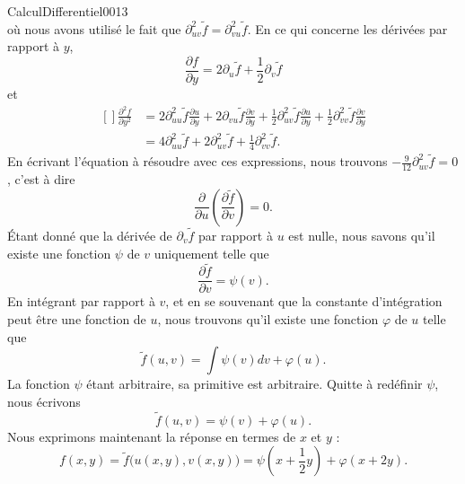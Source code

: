 \begin{corrige}{CalculDifferentiel0013}
\begin{equation}
	\end{equation}
	où nous avons utilisé le fait que $\partial^2_{uv}\tilde f=\partial^2_{vu}\tilde f$. En ce qui concerne les dérivées par rapport à $y$,
	\begin{equation}
		\frac{ \partial f }{ \partial y }=2\partial_u\tilde f+\frac{ 1 }{2}\partial_v\tilde f
	\end{equation}
	et
	\begin{equation}
		\begin{aligned}[]
			\frac{ \partial^2f }{ \partial y^2 }&=2\partial^2_{uu}\tilde f\frac{ \partial u }{ \partial y }+2\partial_{vu}\tilde f\frac{ \partial v }{ \partial y }+\frac{ 1 }{2}\partial^2_{uv}\tilde f\frac{ \partial u }{ \partial y }+\frac{ 1 }{2}\partial^2_{vv}\tilde f\frac{ \partial v }{ \partial y }\\
			&=4\partial^2_{uu}\tilde f+2\partial^2_{uv}\tilde f+\frac{1}{ 4 }\partial^2_{vv}\tilde f.
		\end{aligned}
	\end{equation}
	En écrivant l'équation à résoudre avec ces expressions, nous trouvons $-\frac{ 9 }{ 12 }\partial^2_{uv}\tilde f=0$, c'est à dire
	\begin{equation}
		\frac{ \partial  }{ \partial u }\left( \frac{ \partial \tilde f }{ \partial v } \right)=0.
	\end{equation}
	Étant donné que la dérivée de $\partial_v\tilde f$ par rapport à $u$ est nulle, nous savons qu'il existe une fonction $\psi$ de $v$ uniquement telle que
	\begin{equation}
		\frac{ \partial \tilde f }{ \partial v }=\psi(v).
	\end{equation}
	En intégrant par rapport à $v$, et en se souvenant que la constante d'intégration peut être une fonction de $u$, nous trouvons qu'il existe une fonction $\varphi$ de $u$ telle que
	\begin{equation}
		\tilde f(u,v)=\int\psi(v)dv+\varphi(u).
	\end{equation}
	La fonction $\psi$ étant arbitraire, sa primitive est arbitraire. Quitte à redéfinir $\psi$, nous écrivons
	\begin{equation}
		\tilde f(u,v)=\psi(v)+\varphi(u).
	\end{equation}
	Nous exprimons maintenant la réponse en termes de $x$ et $y$ :
	\begin{equation}
		f(x,y)=\tilde f\big( u(x,y),v(x,y) \big)=\psi(x+\frac{ 1 }{2}y)+\varphi(x+2y).
	\end{equation}

\end{corrige}
